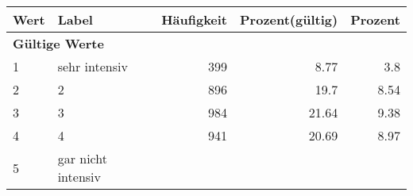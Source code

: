      \begin{longtable}{lXrrr}
     \toprule
     \textbf{Wert} & \textbf{Label} & \textbf{Häufigkeit} & \textbf{Prozent(gültig)} & \textbf{Prozent} \\
     \endhead
     \midrule
     \multicolumn{5}{l}{\textbf{Gültige Werte}}\\

     1 &
     \multicolumn{1}{X}{ sehr intensiv   } &


       \num{399} &
       \num[round-mode=places,round-precision=2]{8.77} &
         \num[round-mode=places,round-precision=2]{3.8} \\

     2 &
     \multicolumn{1}{X}{ 2   } &


       \num{896} &
       \num[round-mode=places,round-precision=2]{19.7} &
         \num[round-mode=places,round-precision=2]{8.54} \\

     3 &
     \multicolumn{1}{X}{ 3   } &


       \num{984} &
       \num[round-mode=places,round-precision=2]{21.64} &
         \num[round-mode=places,round-precision=2]{9.38} \\

     4 &
     \multicolumn{1}{X}{ 4   } &


       \num{941} &
       \num[round-mode=places,round-precision=2]{20.69} &
         \num[round-mode=places,round-precision=2]{8.97} \\

     5 &
     \multicolumn{1}{X}{ gar nicht intensiv   } &



\end{longtable}
